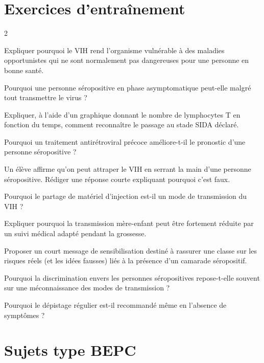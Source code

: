 \section{Exercices d'entraînement}
\begin{multicols}{2}

\exo{} Expliquer pourquoi le VIH rend l'organisme vulnérable à des maladies
opportunistes qui ne sont normalement pas dangereuses pour une personne en bonne santé.

\exo{} Pourquoi une personne séropositive en phase asymptomatique peut-elle
malgré tout transmettre le virus ?

\exo{} Expliquer, à l'aide d'un graphique donnant le nombre de lymphocytes T en
fonction du temps, comment reconnaître le passage au stade SIDA déclaré.

\exo{} Pourquoi un traitement antirétroviral précoce améliore-t-il le pronostic
d'une personne séropositive ?

\exo{} Un élève affirme qu'on peut attraper le VIH en serrant la main d'une
personne séropositive. Rédiger une réponse courte expliquant pourquoi c'est faux.

\exo{} Pourquoi le partage de matériel d'injection est-il un mode de transmission
du VIH ?

\exo{} Expliquer pourquoi la transmission mère-enfant peut être fortement réduite
par un suivi médical adapté pendant la grossesse.

\exo{} Proposer un court message de sensibilisation destiné à rassurer une classe
sur les risques réels (et les idées fausses) liés à la présence d'un camarade
séropositif.

\exo{} Pourquoi la discrimination envers les personnes séropositives repose-t-elle
souvent sur une méconnaissance des modes de transmission ?

\exo{} Pourquoi le dépistage régulier est-il recommandé même en l'absence de
symptômes ?

\end{multicols}

\section{Sujets type BEPC}


